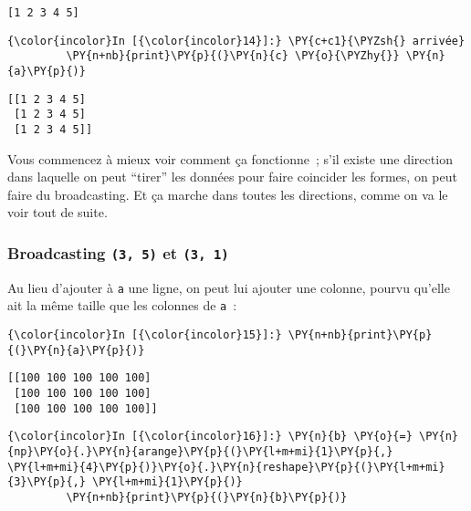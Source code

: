     \begin{Verbatim}[commandchars=\\\{\}]
[1 2 3 4 5]

    \end{Verbatim}

    \begin{Verbatim}[commandchars=\\\{\}]
{\color{incolor}In [{\color{incolor}14}]:} \PY{c+c1}{\PYZsh{} arrivée}
         \PY{n+nb}{print}\PY{p}{(}\PY{n}{c} \PY{o}{\PYZhy{}} \PY{n}{a}\PY{p}{)}
\end{Verbatim}


    \begin{Verbatim}[commandchars=\\\{\}]
[[1 2 3 4 5]
 [1 2 3 4 5]
 [1 2 3 4 5]]

    \end{Verbatim}

    Vous commencez à mieux voir comment ça fonctionne~; s'il existe une
direction dans laquelle on peut ``tirer'' les données pour faire
coincider les formes, on peut faire du broadcasting. Et ça marche dans
toutes les directions, comme on va le voir tout de suite.

    \hypertarget{broadcasting-3-5-et-3-1}{%
\subsubsection{\texorpdfstring{Broadcasting \texttt{(3,\ 5)} et
\texttt{(3,\ 1)}}{Broadcasting (3, 5) et (3, 1)}}\label{broadcasting-3-5-et-3-1}}

    Au lieu d'ajouter à \texttt{a} une ligne, on peut lui ajouter une
colonne, pourvu qu'elle ait la même taille que les colonnes de
\texttt{a}~:

    \begin{Verbatim}[commandchars=\\\{\}]
{\color{incolor}In [{\color{incolor}15}]:} \PY{n+nb}{print}\PY{p}{(}\PY{n}{a}\PY{p}{)}
\end{Verbatim}


    \begin{Verbatim}[commandchars=\\\{\}]
[[100 100 100 100 100]
 [100 100 100 100 100]
 [100 100 100 100 100]]

    \end{Verbatim}

    \begin{Verbatim}[commandchars=\\\{\}]
{\color{incolor}In [{\color{incolor}16}]:} \PY{n}{b} \PY{o}{=} \PY{n}{np}\PY{o}{.}\PY{n}{arange}\PY{p}{(}\PY{l+m+mi}{1}\PY{p}{,} \PY{l+m+mi}{4}\PY{p}{)}\PY{o}{.}\PY{n}{reshape}\PY{p}{(}\PY{l+m+mi}{3}\PY{p}{,} \PY{l+m+mi}{1}\PY{p}{)}
         \PY{n+nb}{print}\PY{p}{(}\PY{n}{b}\PY{p}{)}
\end{Verbatim}


